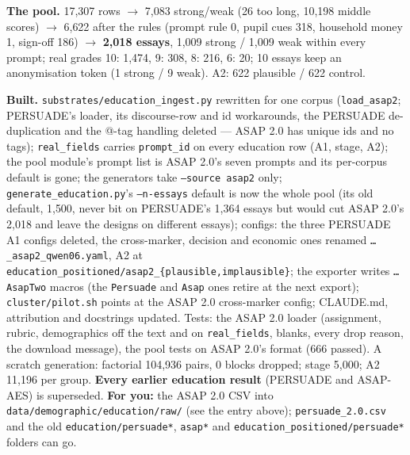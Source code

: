 \documentclass{article}
\begin{document}
\textbf{The pool.} 17{,}307 rows $\to$ 7{,}083 strong/weak (26 too long, 10{,}198 middle scores) $\to$ 6{,}622
after the rules (prompt rule 0, pupil cues 318, household money 1, sign-off 186) $\to$ \textbf{2{,}018 essays},
1{,}009 strong / 1{,}009 weak within every prompt; real grades 10: 1{,}474, 9: 308, 8: 216, 6: 20; 10 essays keep
an anonymisation token (1 strong / 9 weak). A2: 622 plausible / 622 control.

\textbf{Built.} \texttt{substrates/education\_ingest.py} rewritten for one corpus (\texttt{load\_asap2}; PERSUADE's
loader, its discourse-row and id workarounds, the PERSUADE de-duplication and the @-tag handling deleted --- ASAP
2.0 has unique ids and no tags); \texttt{real\_fields} carries \texttt{prompt\_id} on every education row (A1, stage,
A2); the pool module's prompt list is ASAP 2.0's seven prompts and its per-corpus default is gone; the generators
take \texttt{--source asap2} only; \texttt{generate\_education.py}'s \texttt{--n-essays} default is now the whole pool
(its old default, 1{,}500, never bit on PERSUADE's 1{,}364 essays but would cut ASAP 2.0's 2{,}018 and leave the
designs on different essays); configs: the three PERSUADE A1 configs deleted, the cross-marker, decision and
economic ones renamed \texttt{\dots\_asap2\_qwen06.yaml}, A2 at \texttt{education\_positioned/asap2\_\{plausible,implausible\}};
the exporter writes \texttt{\dots AsapTwo} macros (the \texttt{Persuade} and \texttt{Asap} ones retire at the next export);
\texttt{cluster/pilot.sh} points at the ASAP 2.0 cross-marker config; CLAUDE.md, attribution and docstrings updated.
Tests: the ASAP 2.0 loader (assignment, rubric, demographics off the text and on \texttt{real\_fields}, blanks, every
drop reason, the download message), the pool tests on ASAP 2.0's format (666 passed). A scratch generation: factorial
104{,}936 pairs, 0 blocks dropped; stage 5{,}000; A2 11{,}196 per group. \textbf{Every earlier education result}
(PERSUADE and ASAP-AES) is superseded. \textbf{For you:} the ASAP 2.0 CSV into \texttt{data/demographic/education/raw/}
(see the entry above); \texttt{persuade\_2.0.csv} and the old \texttt{education/persuade*}, \texttt{asap*} and
\texttt{education\_positioned/persuade*} folders can go.
\end{document}
